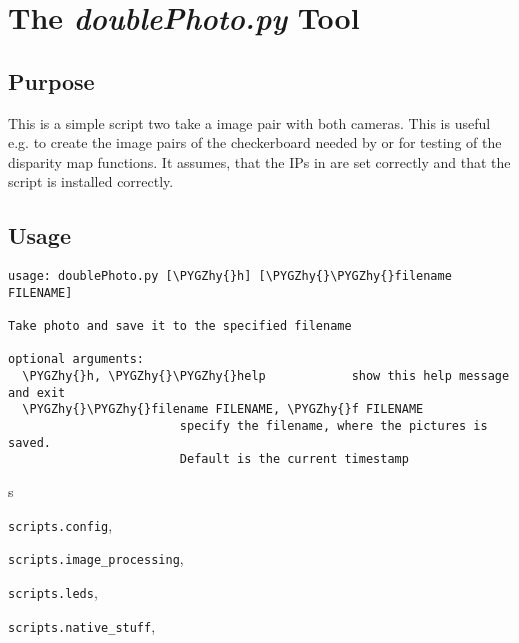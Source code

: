 \documentclass[a4paper,10pt,openany,oneside]{sphinxmanual}
\def\PYGZhy{\char`\-}
\begin{document}
\section{The \emph{doublePhoto.py} Tool}
\label{index:the-doublephoto-py-tool}

\subsection{Purpose}
\label{index:id3}
This is a simple script two take a image pair with both cameras. This is useful
e.g. to create the image pairs of the checkerboard needed by
 or for testing of the disparity map
functions. It assumes, that the IPs in  are set correctly
and that the script  is installed correctly.


\subsection{Usage}
\label{index:id4}
\begin{Verbatim}[commandchars=\\\{\}]
usage: doublePhoto.py [\PYGZhy{}h] [\PYGZhy{}\PYGZhy{}filename FILENAME]

Take photo and save it to the specified filename

optional arguments:
  \PYGZhy{}h, \PYGZhy{}\PYGZhy{}help            show this help message and exit
  \PYGZhy{}\PYGZhy{}filename FILENAME, \PYGZhy{}f FILENAME
                        specify the filename, where the pictures is saved.
                        Default is the current timestamp
\end{Verbatim}


\renewcommand{\indexname}{Python Module Index}
\begin{theindex}
\def\bigletter#1{{\Large\sffamily#1}\nopagebreak\vspace{1mm}}
\bigletter{s}
\item {\texttt{scripts.config}}, \pageref{index:module-scripts.config}
\item {\texttt{scripts.image\_processing}}, \pageref{index:module-scripts.image_processing}
\item {\texttt{scripts.leds}}, \pageref{index:module-scripts.leds}
\item {\texttt{scripts.native\_stuff}}, \pageref{index:module-scripts.native_stuff}
\end{theindex}

\renewcommand{\indexname}{Index}
\printindex
\end{document}
